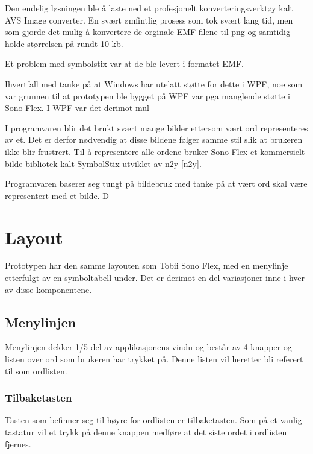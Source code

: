 Den endelig løsningen ble å laste ned et profesjonelt konverteringsverktøy kalt AVS Image converter. En svært ømfintlig prosess som tok svært lang tid, men som gjorde det mulig å konvertere de orginale EMF filene til png og samtidig holde størrelsen på rundt 10 kb.







Et problem med symbolstix var at de ble levert i formatet EMF. 


 Ihvertfall med tanke på at Windows har utelatt støtte for dette i WPF, noe som var grunnen til at prototypen ble bygget på WPF var pga manglende støtte i Sono Flex. I WPF var det derimot mul




I programvaren blir det brukt svært mange bilder ettersom vært ord representeres av et. Det er derfor nødvendig at disse bildene følger samme stil slik at brukeren ikke blir frustrert. Til å representere alle ordene bruker Sono Flex et kommersielt bilde bibliotek kalt SymbolStix utviklet av n2y \ref{n2y}. 

Programvaren baserer seg tungt på bildebruk med tanke på at vært ord skal være representert med et bilde. D 

\section{Layout}

Prototypen har den samme layouten som Tobii Sono Flex, med en menylinje etterfulgt av en symboltabell under. Det er derimot en del variasjoner inne i hver av disse komponentene.

\subsection{Menylinjen}

Menylinjen dekker 1/5 del av applikasjonens vindu og består av 4 knapper og listen over ord som brukeren har trykket på. Denne listen vil heretter bli referert til som ordlisten.

\subsubsection{Tilbaketasten}

Tasten som befinner seg til høyre for ordlisten er tilbaketasten. Som på et vanlig tastatur vil et trykk på denne knappen medføre at det siste ordet i ordlisten fjernes.

